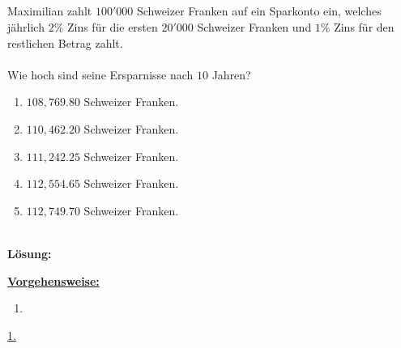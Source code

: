 \subsection*{}
Maximilian zahlt $100'000$ Schweizer Franken auf ein Sparkonto ein, welches jährlich $2 \%$ Zins für die ersten $20'000$ Schweizer Franken und $1 \%$ Zins für den restlichen Betrag zahlt.\\
\\
Wie hoch sind seine Ersparnisse nach $10 $ Jahren?
\renewcommand{\labelenumi}{(\alph{enumi})}
\begin{enumerate}
	\item
	$108,769.80$ Schweizer Franken.
	\item
	$110,462.20$ Schweizer Franken.	
	\item 
	$111,242.25$ Schweizer Franken.
	\item
	$112,554.65$ Schweizer Franken.
	\item
	$112,749.70$ Schweizer Franken.
\end{enumerate}
\ \\
\textbf{Lösung:}
\begin{mdframed}
\underline{\textbf{Vorgehensweise:}}
\renewcommand{\labelenumi}{\theenumi.}
\begin{enumerate}
\item 
\end{enumerate}
\end{mdframed}

\underline{1. }\\

\newpage

